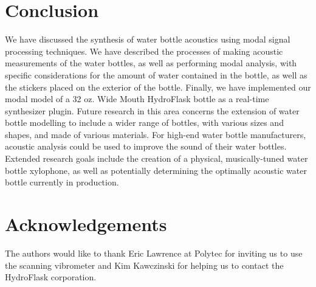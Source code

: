 \documentclass[twoside,a4paper]{article}
\begin{document}
%
\section{Conclusion} \label{sec:conclusion}
%
We have discussed the synthesis of water bottle acoustics
using modal signal processing techniques. We have described the processes
of making acoustic measurements of the water bottles, as well as performing
modal analysis, with specific considerations for the amount of water
contained in the bottle, as well as the stickers placed on the exterior
of the bottle. Finally, we have implemented our modal model of a 32 oz.
Wide Mouth HydroFlask bottle as a real-time synthesizer plugin.
\newline\newline
Future research in this area concerns the extension of water bottle
modelling to include a wider range of bottles, with various sizes and
shapes, and made of various materials. For high-end water bottle
manufacturers, acoustic analysis could be used to improve the sound
of their water bottles. Extended research goals include the creation
of a physical, musically-tuned water bottle xylophone, as well as potentially
determining the optimally acoustic water bottle currently in production.

\section{Acknowledgements}
%
The authors would like to thank Eric Lawrence at Polytec for inviting us to use the scanning vibrometer and Kim Kawczinski for helping us to contact
the HydroFlask corporation.

\nocite{*}


\end{document}
